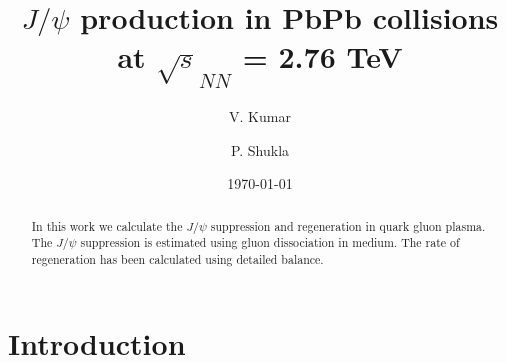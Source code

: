 \documentclass[aps,prc,preprint,superscriptaddress,showpacs,showkeys]{revtex4-1}
\begin{document}
\linenumbers

\title{{\Large $J/\psi$ production in PbPb collisions at $\sqrt s_{NN}$ =  2.76 TeV }}

\author{\large V. Kumar}
\author{\large P. Shukla}

\date{\today}


\begin{abstract}

 In this work we calculate the $J/\psi$ suppression and regeneration in quark gluon plasma.
The $J/\psi$ suppression is estimated using gluon dissociation in medium. The rate of 
regeneration has been calculated using detailed balance. 
 
 
 

\end{abstract}




\maketitle


\section{Introduction}

\end{document}
